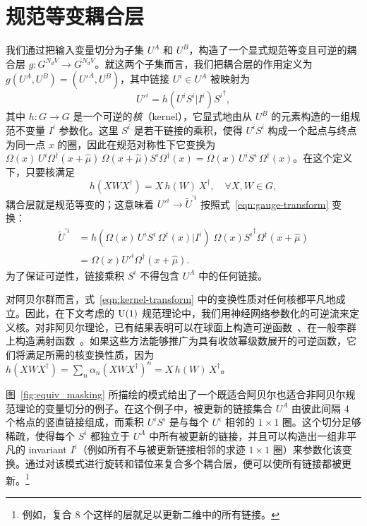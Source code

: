 \section{规范等变耦合层}
我们通过把输入变量切分为子集 $U^A$ 和 $U^B$，构造了一个显式规范等变且可逆的耦合层 $g: G^{N_d V} \rightarrow G^{N_d V}$。就这两个子集而言，我们把耦合层的作用定义为 ${g(U^A, U^B) = ({U'}^A, U^B)}$，其中链接 $U^i \in U^A$ 被映射为
%
\begin{equation} \label{eqn:gauge-equiv-coupling}
{U'}^i = h(U^i S^i | I^i) {S^i}^{\dagger},
\end{equation}
%
其中 $h: G \rightarrow G$ 是一个可逆的\emph{核}（kernel），它显式地由从 $U^B$ 的元素构造的一组规范不变量 $I^i$ 参数化。这里 $S^i$ 是若干链接的乘积，使得 $U^i S^i$ 构成一个起点与终点为同一点 $x$ 的圈，因此在规范对称性下它变换为 $\Omega(x) \, U^i \Omega^\dagger(x+\hat{\mu}) \, \Omega(x+\hat{\mu}) S^i \Omega^\dagger(x) = \Omega(x) \, U^i S^i \, \Omega^\dagger(x)$。在这个定义下，只要核满足
%
\begin{equation} \label{eqn:kernel-transform}
    h(X W X^\dagger) = X \, h(W) \, X^\dagger, \quad \forall X, W \in G,
\end{equation}
%
耦合层就是规范等变的；这意味着 ${U'}^i \rightarrow {\widetilde{U}}^{\prime i}$ 按照式~\eqref{eqn:gauge-transform} 变换：
\begin{equation}
\begin{aligned}
    {\widetilde{U}}^{\prime i} &= h\left( \Omega(x) \, U^i S^i \, \Omega^\dagger(x) | I^i \right) \; \Omega(x) {S^i}^\dagger \Omega^\dagger(x+\hat{\mu}) \\
    &= \Omega(x) {U'}^i \Omega^\dagger(x+\hat{\mu}).
\end{aligned}
\end{equation}
为了保证可逆性，链接乘积 $S^i$ 不得包含 $U^A$ 中的任何链接。

对阿贝尔群而言，式~\eqref{eqn:kernel-transform} 中的变换性质对任何核都平凡地成立。因此，在下文考虑的 $\mathrm{U}(1)$ 规范理论中，我们用神经网络参数化的可逆流来定义核。对非阿贝尔理论，已有结果表明可以在球面上构造可逆函数~\cite{rezende2020normalizing}、在一般李群上构造满射函数~\cite{falorsi19lie}。如果这些方法能够推广为具有收敛幂级数展开的可逆函数，它们将满足所需的核变换性质，因为 ${h(X W X^\dagger) = \sum_n \alpha_n (X W X^\dagger)^n = X \, h(W) \, X^\dagger}$。

图~\ref{fig:equiv_masking} 所描绘的模式给出了一个既适合阿贝尔也适合非阿贝尔规范理论的变量切分的例子。在这个例子中，被更新的链接集合 $U^A$ 由彼此间隔 4 个格点的竖直链接组成，而乘积 $U^i S^i$ 是与每个 $U^i$ 相邻的 $1\times1$ 圈。这个切分足够稀疏，使得每个 $S^i$ 都独立于 $U^A$ 中所有被更新的链接，并且可以构造出一组非平凡的 invariant $I^i$（例如所有不与被更新链接相邻的求迹 $1\times1$ 圈）来参数化该变换。通过对该模式进行旋转和错位来复合多个耦合层，便可以使所有链接都被更新。\footnote{例如，复合 8 个这样的层就足以更新二维中的所有链接。}

